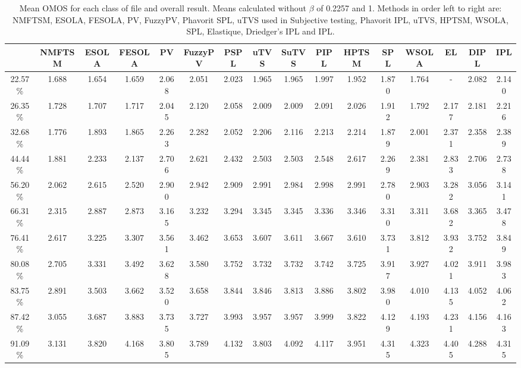 \begin{table*}[ht]
\caption{Mean OMOS for each class of file and overall result. Means calculated without $\beta$ of 0.2257 and 1. Methods in order left to right are: NMFTSM, ESOLA, FESOLA, PV, FuzzyPV, Phavorit SPL, uTVS used in Subjective testing, Phavorit IPL, uTVS, HPTSM, WSOLA, SPL, Elastique, Driedger's IPL and IPL.}
\centering
\begin{ruledtabular}
\begin{tabular}{cccccccccccccccc}
 & NMFTSM & ESOLA & FESOLA & PV & FuzzyPV & PSPL & uTVS & SuTVS & PIPL & HPTSM & SPL & WSOLA & EL & DIPL & IPL \\
\hline
22.57\% & 1.688 & 1.654 & 1.659 & 2.068 & 2.051 & 2.023 & 1.965 & 1.965 & 1.997 & 1.952 & 1.870 & 1.764 & - & 2.082 & 2.140 \\
\hline
26.35\% & 1.728 & 1.707 & 1.717 & 2.045 & 2.120 & 2.058 & 2.009 & 2.009 & 2.091 & 2.026 & 1.912 & 1.792 & 2.177 & 2.181 & 2.216 \\
\hline
32.68\% & 1.776 & 1.893 & 1.865 & 2.263 & 2.282 & 2.052 & 2.206 & 2.116 & 2.213 & 2.214 & 1.879 & 2.001 & 2.371 & 2.358 & 2.389 \\
\hline
44.44\% & 1.881 & 2.233 & 2.137 & 2.706 & 2.621 & 2.432 & 2.503 & 2.503 & 2.548 & 2.617 & 2.269 & 2.381 & 2.833 & 2.706 & 2.738 \\
\hline
56.20\% & 2.062 & 2.615 & 2.520 & 2.900 & 2.942 & 2.909 & 2.991 & 2.984 & 2.998 & 2.991 & 2.780 & 2.903 & 3.282 & 3.056 & 3.141 \\
\hline
66.31\% & 2.315 & 2.887 & 2.873 & 3.165 & 3.232 & 3.294 & 3.345 & 3.345 & 3.336 & 3.346 & 3.310 & 3.311 & 3.682 & 3.365 & 3.478 \\
\hline
76.41\% & 2.617 & 3.225 & 3.307 & 3.561 & 3.462 & 3.653 & 3.607 & 3.611 & 3.667 & 3.610 & 3.731 & 3.812 & 3.932 & 3.752 & 3.849 \\
\hline
80.08\% & 2.705 & 3.331 & 3.492 & 3.628 & 3.580 & 3.752 & 3.732 & 3.732 & 3.742 & 3.725 & 3.917 & 3.927 & 4.021 & 3.911 & 3.983 \\
\hline
83.75\% & 2.891 & 3.503 & 3.662 & 3.520 & 3.658 & 3.844 & 3.846 & 3.813 & 3.886 & 3.802 & 3.980 & 4.010 & 4.135 & 4.052 & 4.062 \\
\hline
87.42\% & 3.055 & 3.687 & 3.883 & 3.735 & 3.727 & 3.993 & 3.957 & 3.957 & 3.999 & 3.822 & 4.129 & 4.193 & 4.231 & 4.156 & 4.163 \\
\hline
91.09\% & 3.131 & 3.820 & 4.168 & 3.805 & 3.789 & 4.132 & 3.803 & 4.092 & 4.117 & 3.951 & 4.315 & 4.323 & 4.405 & 4.288 & 4.315 \\

\end{tabular}
\end{ruledtabular}
\end{table*}
